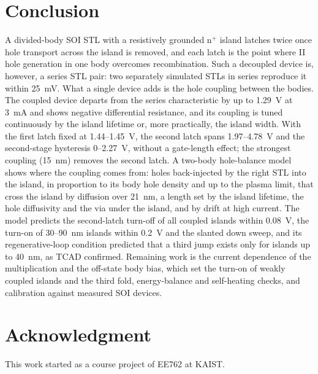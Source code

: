 \documentclass[journal]{IEEEtran}
\begin{document}
\section{Conclusion}
A divided-body SOI STL with a resistively grounded n$^+$ island latches twice once hole transport across the island is removed, and each latch is the point where II hole generation in one body overcomes recombination. Such a decoupled device is, however, a series STL pair: two separately simulated STLs in series reproduce it within 25~mV. What a single device adds is the hole coupling between the bodies. The coupled device departs from the series characteristic by up to 1.29~V at 3~mA and shows negative differential resistance, and its coupling is tuned continuously by the island lifetime or, more practically, the island width. With the first latch fixed at 1.44--1.45~V, the second latch spans 1.97--4.78~V and the second-stage hysteresis 0--2.27~V, without a gate-length effect; the strongest coupling (15~nm) removes the second latch. A two-body hole-balance model shows where the coupling comes from: holes back-injected by the right STL into the island, in proportion to its body hole density and up to the plasma limit, that cross the island by diffusion over 21~nm, a length set by the island lifetime, the hole diffusivity and the via under the island, and by drift at high current. The model predicts the second-latch turn-off of all coupled islands within 0.08~V, the turn-on of 30--90~nm islands within 0.2~V and the slanted down sweep, and its regenerative-loop condition predicted that a third jump exists only for islands up to 40~nm, as TCAD confirmed. Remaining work is the current dependence of the multiplication and the off-state body bias, which set the turn-on of weakly coupled islands and the third fold, energy-balance and self-heating checks, and calibration against measured SOI devices.

\section*{Acknowledgment}
This work started as a course project of EE762 at KAIST.
\end{document}
